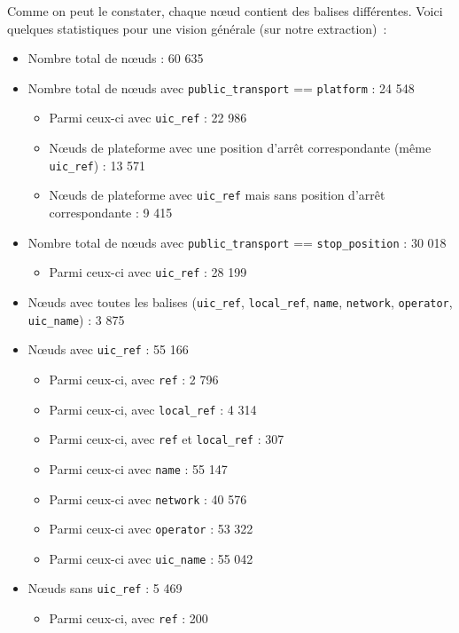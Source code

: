Comme on peut le constater, chaque nœud contient des balises différentes. Voici quelques statistiques pour une vision générale (sur notre extraction) :
\begin{itemize}
    \item Nombre total de nœuds : 60 635
    \item Nombre total de nœuds avec \texttt{public\_transport} == \texttt{platform} : 24 548
    \begin{itemize}
        \item Parmi ceux-ci avec \texttt{uic\_ref} : 22 986
        \item Nœuds de plateforme avec une position d'arrêt correspondante (même \texttt{uic\_ref}) : 13 571
        \item Nœuds de plateforme avec \texttt{uic\_ref} mais sans position d'arrêt correspondante : 9 415
    \end{itemize}
    \item Nombre total de nœuds avec \texttt{public\_transport} == \texttt{stop\_position} : 30 018
    \begin{itemize}
        \item Parmi ceux-ci avec \texttt{uic\_ref} : 28 199
    \end{itemize}
    \item Nœuds avec toutes les balises (\texttt{uic\_ref}, \texttt{local\_ref}, \texttt{name}, \texttt{network}, \texttt{operator}, \texttt{uic\_name}) : 3 875
    \item Nœuds avec \texttt{uic\_ref} : 55 166
    \begin{itemize}
        \item Parmi ceux-ci, avec \texttt{ref} : 2 796
        \item Parmi ceux-ci, avec \texttt{local\_ref} : 4 314
        \item Parmi ceux-ci, avec \texttt{ref} et \texttt{local\_ref} : 307
        \item Parmi ceux-ci avec \texttt{name} : 55 147
        \item Parmi ceux-ci avec \texttt{network} : 40 576
        \item Parmi ceux-ci avec \texttt{operator} : 53 322
        \item Parmi ceux-ci avec \texttt{uic\_name} : 55 042
    \end{itemize}
    \item Nœuds sans \texttt{uic\_ref} : 5 469
    \begin{itemize}
        \item Parmi ceux-ci, avec \texttt{ref} : 200

\end{itemize}
\end{itemize}
